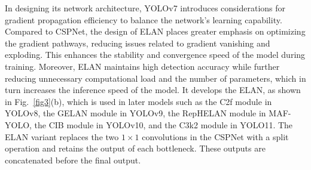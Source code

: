 In designing its network architecture, YOLOv7 introduces considerations for gradient propagation efficiency to balance the network's learning capability. Compared to CSPNet, the design of ELAN places greater emphasis on optimizing the gradient pathways, reducing issues related to gradient vanishing and exploding. This enhances the stability and convergence speed of the model during training. Moreover, ELAN maintains high detection accuracy while further reducing unnecessary computational load and the number of parameters, which in turn increases the inference speed of the model. It develops the ELAN, as shown in Fig.~\ref{fig3}(b), which is used in later models such as the C2f module in YOLOv8, the GELAN module in YOLOv9, the RepHELAN module in MAF-YOLO, the CIB module in YOLOv10, and the C3k2 module in YOLO11. The ELAN variant replaces the two $1 \times 1$ convolutions in the CSPNet with a split operation and retains the output of each bottleneck. These outputs are concatenated before the final output.

